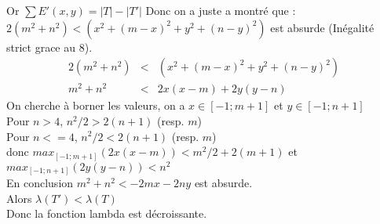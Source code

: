 Or $\sum E'(x,y) = |T|-|T'|$
Donc on a juste a montré que : \\
$2(m^2+n^2) < (x^2 + (m-x)^2 + y^2 + (n-y)^2)$ est absurde (Inégalité strict grace au 8).
\begin{eqnarray*}
  2(m^2+n^2) & < & (x^2 + (m-x)^2 + y^2 + (n-y)^2)\\
  m^2 + n^2 & < & 2x(x-m)+2y(y-n)
\end{eqnarray*}
On cherche à borner les valeurs, on a $x \in [-1;m+1]$ et $y \in [-1;n+1]$ \\
Pour $n>4$, $n^2/2 > 2(n+1)$ (resp. $m$) \\
Pour $n<=4$, $n^2/2 < 2(n+1)$ (resp. $m$) \\
donc $max_{[-1;m+1]}(2x(x-m)) < m^2/2 + 2(m+1)$ et $max_{[-1;n+1]}(2y(y-n)) < n^2$ \\
En conclusion $m^2 + n^2 < -2mx -2ny$ est absurde. \\
Alors $\lambda(T') < \lambda(T)$ \\
Donc la fonction lambda est décroissante.



